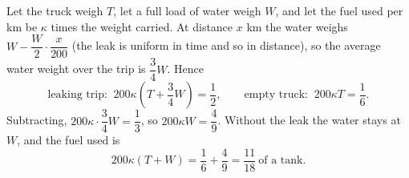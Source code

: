 Let the truck weigh $T$, let a full load of water weigh $W$, and let the fuel used per km be $\kappa$ times the weight carried. At distance $x$ km the water weighs $W-\dfrac{W}{2}\cdot\dfrac{x}{200}$ (the leak is uniform in time and so in distance), so the average water weight over the trip is $\dfrac{3}{4}W$. Hence
\[
\text{leaking trip: }\ 200\kappa\left(T+\dfrac{3}{4}W\right)=\dfrac{1}{2},\qquad\text{empty truck: }\ 200\kappa T=\dfrac{1}{6} .
\]
Subtracting, $200\kappa\cdot\dfrac{3}{4}W=\dfrac{1}{3}$, so $200\kappa W=\dfrac{4}{9}$. Without the leak the water stays at $W$, and the fuel used is
\[
200\kappa(T+W)=\dfrac{1}{6}+\dfrac{4}{9}=\boxed{\dfrac{11}{18}}\ \text{of a tank}.
\]
